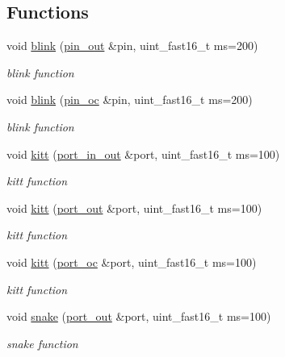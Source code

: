 \subsection*{Functions}
\begin{DoxyCompactItemize}
\item 
void \hyperlink{namespacehwlib_a07ec2b554dc2b3f7e20acfa07158bbdc}{blink} (\hyperlink{classhwlib_1_1pin__out}{pin\+\_\+out} \&pin, uint\+\_\+fast16\+\_\+t ms=200)
\begin{DoxyCompactList}\small\item\em blink function \end{DoxyCompactList}\item 
void \hyperlink{namespacehwlib_a4da0954a246d92ba3e62f22fa52bf3a3}{blink} (\hyperlink{classhwlib_1_1pin__oc}{pin\+\_\+oc} \&pin, uint\+\_\+fast16\+\_\+t ms=200)
\begin{DoxyCompactList}\small\item\em blink function \end{DoxyCompactList}\item 
void \hyperlink{namespacehwlib_aaabcbce6ceaee099d8b63d7ced145cea}{kitt} (\hyperlink{classhwlib_1_1port__in__out}{port\+\_\+in\+\_\+out} \&port, uint\+\_\+fast16\+\_\+t ms=100)
\begin{DoxyCompactList}\small\item\em kitt function \end{DoxyCompactList}\item 
void \hyperlink{namespacehwlib_a0e6f0ad32ff93519562a880047f3fc2e}{kitt} (\hyperlink{classhwlib_1_1port__out}{port\+\_\+out} \&port, uint\+\_\+fast16\+\_\+t ms=100)
\begin{DoxyCompactList}\small\item\em kitt function \end{DoxyCompactList}\item 
void \hyperlink{namespacehwlib_a2f86682625c78a7c595bac456ed81b5c}{kitt} (\hyperlink{classhwlib_1_1port__oc}{port\+\_\+oc} \&port, uint\+\_\+fast16\+\_\+t ms=100)
\begin{DoxyCompactList}\small\item\em kitt function \end{DoxyCompactList}\item 
void \hyperlink{namespacehwlib_ade8d1e7034d2491a2180116619ec4fbe}{snake} (\hyperlink{classhwlib_1_1port__out}{port\+\_\+out} \&port, uint\+\_\+fast16\+\_\+t ms=100)
\begin{DoxyCompactList}\small\item\em snake function \end{DoxyCompactList}\item 

\end{DoxyCompactItemize}

